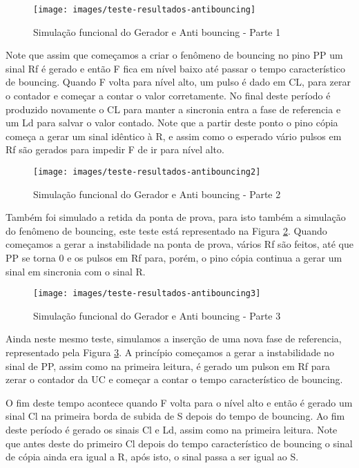 \documentclass[12pt,a4paper,openany]{abntex2}
\begin{document}
\begin{figure}[!htp]
	\centering
	\caption{Simulação funcional do Gerador e Anti bouncing - Parte 1}
	\texttt{[image: images/teste-resultados-antibouncing]}	\label{fig:teste-resultados-antibouncing}
\end{figure}

Note que assim que começamos a criar o fenômeno de bouncing no pino PP um sinal Rf é gerado e então F fica em nível baixo até passar o tempo característico de bouncing. Quando F volta para nível alto, um pulso é dado em CL, para zerar o contador e começar a contar o valor corretamente. No final deste período é produzido novamente o CL para manter a sincronia entra a fase de referencia e um Ld para salvar o valor contado. Note que a partir deste ponto o pino cópia começa a gerar um sinal idêntico à R, e assim como o esperado vário pulsos em Rf são gerados para impedir F de ir para nível alto.

\begin{figure}[!htp]
	\centering
	\caption{Simulação funcional do Gerador e Anti bouncing - Parte 2}
	\texttt{[image: images/teste-resultados-antibouncing2]}	\label{fig:teste-resultados-antibouncing2}
\end{figure}

Também foi simulado a retida da ponta de prova, para isto também a simulação do fenômeno de bouncing, este teste está representado na Figura \ref{fig:teste-resultados-antibouncing2}. Quando começamos a gerar a instabilidade na ponta de prova, vários Rf são feitos, até que PP se torna 0 e os pulsos em Rf para, porém, o pino cópia continua a gerar um sinal em sincronia com o sinal R.

\begin{figure}[!htp]
	\centering
	\caption{Simulação funcional do Gerador e Anti bouncing - Parte 3}
	\texttt{[image: images/teste-resultados-antibouncing3]}	\label{fig:teste-resultados-antibouncing3}
\end{figure}

Ainda neste mesmo teste, simulamos a inserção de uma nova fase de referencia, representado pela Figura \ref{fig:teste-resultados-antibouncing3}. A princípio começamos a gerar a instabilidade no sinal de PP, assim como na primeira leitura, é gerado um pulson em Rf para zerar o contador da UC e começar a contar o tempo característico de bouncing. 

O fim deste tempo acontece quando F volta para o nível alto e então é gerado um sinal Cl na primeira borda de subida de S depois do tempo de bouncing. Ao fim deste período é gerado os sinais Cl e Ld, assim como na primeira leitura. Note que antes deste do primeiro Cl depois do tempo característico de bouncing o sinal de cópia ainda era igual a R, após isto, o sinal passa a ser igual ao S.
\end{document}
